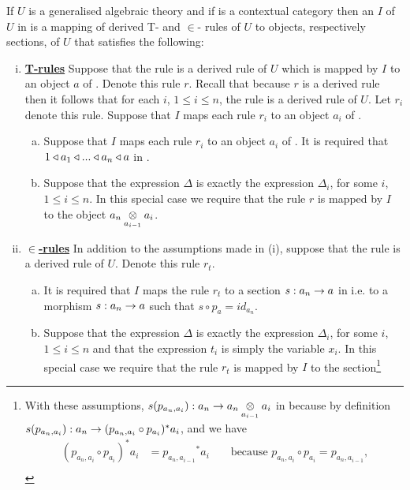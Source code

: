 
\begin{definition}
If $U$ is a generalised algebraic theory and if \catcw is a contextual category then an  $I$ of $U$ in \catcw is a  mapping 
of derived T- and $\in$- rules of $U$ to objects, respectively sections, of $U$ that satisfies the following:
\begin{enumerate}[(i)]
\setlength\itemindent{2cm}
\item \underline{\textbf{T-rules}} 
Suppose that  the rule
 is a derived rule of $U$ which is mapped by $I$ to an object $a$ of \catc. Denote this rule $r$. Recall that because $r$ is a derived rule then it follows  that for each $i$, 
$1 \leq i \leq n$, the rule  is a derived rule of $U$. Let $r_i$ denote this rule.
Suppose that $I$ maps each rule $r_i$ to an object $a_i$ of \catcw.
\begin{enumerate}[(a)]
\item 
Suppose that $I$ maps each rule $r_i$ to an object $a_i$ of \catcw.
It is required that $1 \base a_1 \base ... \base a_n \base a$ in \catc.
\item Suppose that the  expression $\Delta$ is exactly the expression $\Delta_i$, for some $i$, $1 \leq i \leq n$. In this special case we require that the rule $r$  is mapped by $I$ to the object 
$\crossx{a_n}{a_i}{a_{i-1}}$.
\end{enumerate} 
\item \underline{\textbf{$\boldsymbol {\in}$-rules}} 
In addition to the assumptions made in (i),  suppose that the rule
 is a  derived rule of $U$. 
Denote this rule $r_t$. 
\begin{enumerate}[(a)]
\item 
It is required that $I$ maps the rule $r_t$ to a section
 $s:a_n \morph a$ in \catcw i.e. to a morphism $s:a_n \morph a$ such that $s \circ p_a = id_{a_n}$. 
\item Suppose that the  expression $\Delta$ is exactly the expression $\Delta_i$, for some $i$, $1 \leq i \leq n$ and that the expression $t_i$ is simply the variable $x_i$. 
In this special case we require that the rule $r_t$  is mapped by $I$ to the section\footnote{
With these assumptions, $s(p_{a_n,a_i}): a_n \morph \crossx{a_n}{a_i}{a_{i-1}}$ in \catcw because by definition  $s(p_{a_n,a_i}): a_n  \morph (p_{a_n,a_i} \circ p_{a_i})^*a_i$,
and we have 
\begin{align*}
(p_{a_n,a_i} \circ p_{a_i})^*a_i &= {p_{a_n,a_{i-1}}} ^* a_i  && \mbox{ because $p_{a_n,a_i} \circ p_{a_i}=p_{a_n,a_{i-1}}$,} \\

\end{align*}}
\end{enumerate}
\end{enumerate}
\end{definition}
